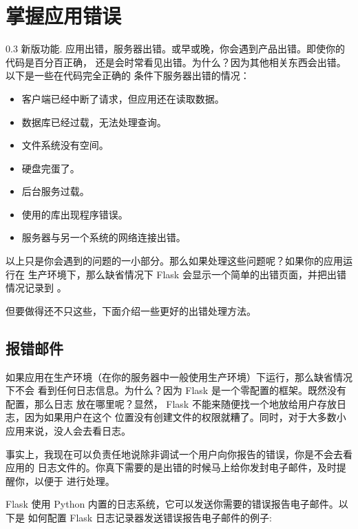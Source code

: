 \documentclass[a4paper,12pt]{sphinxmanual}
\begin{document}
\chapter{掌握应用错误}
\label{errorhandling:application-errors}\label{errorhandling::doc}\label{errorhandling:id1}0.3 新版功能.
应用出错，服务器出错。或早或晚，你会遇到产品出错。即使你的代码是百分百正确，
还是会时常看见出错。为什么？因为其他相关东西会出错。以下是一些在代码完全正确的
条件下服务器出错的情况：
\begin{itemize}
\item {} 
客户端已经中断了请求，但应用还在读取数据。

\item {} 
数据库已经过载，无法处理查询。

\item {} 
文件系统没有空间。

\item {} 
硬盘完蛋了。

\item {} 
后台服务过载。

\item {} 
使用的库出现程序错误。

\item {} 
服务器与另一个系统的网络连接出错。

\end{itemize}

以上只是你会遇到的问题的一小部分。那么如果处理这些问题呢？如果你的应用运行在
生产环境下，那么缺省情况下 Flask 会显示一个简单的出错页面，并把出错情况记录到
{\hyperref[api:flask.Flask.logger]{}} 。

但要做得还不只这些，下面介绍一些更好的出错处理方法。


\section{报错邮件}
\label{errorhandling:id2}
如果应用在生产环境（在你的服务器中一般使用生产环境）下运行，那么缺省情况下不会
看到任何日志信息。为什么？因为 Flask 是一个零配置的框架。既然没有配置，那么日志
放在哪里呢？显然， Flask 不能来随便找一个地放给用户存放日志，因为如果用户在这个
位置没有创建文件的权限就糟了。同时，对于大多数小应用来说，没人会去看日志。

事实上，我现在可以负责任地说除非调试一个用户向你报告的错误，你是不会去看应用的
日志文件的。你真下需要的是出错的时候马上给你发封电子邮件，及时提醒你，以便于
进行处理。

Flask 使用 Python 内置的日志系统，它可以发送你需要的错误报告电子邮件。以下是
如何配置 Flask 日志记录器发送错误报告电子邮件的例子:
\end{document}
